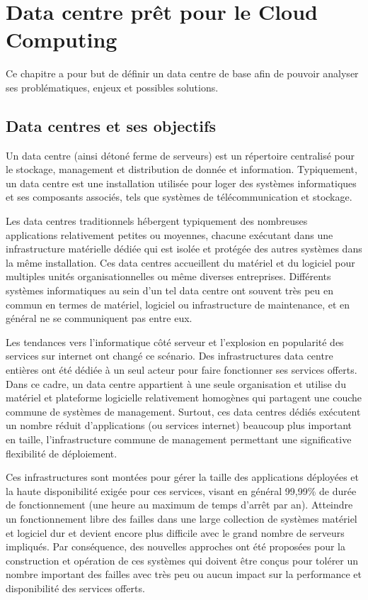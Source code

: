 \chapter{Data centre prêt pour le Cloud Computing}
\label{chap-1}

Ce chapitre a pour but de définir un data centre de base afin de pouvoir analyser ses problématiques, enjeux et possibles solutions.

\section{Data centres et ses objectifs}

Un data centre (ainsi détoné ferme de serveurs) est un répertoire centralisé pour le stockage, management et distribution de donnée et information. Typiquement, un data centre est une installation utilisée pour loger des systèmes informatiques et ses composants associés, tels que systèmes de télécommunication et stockage. \cite{understandingCloudWhatDC}

Les data centres traditionnels hébergent typiquement des nombreuses applications relativement petites ou moyennes, chacune exécutant dans une infrastructure matérielle dédiée qui est isolée et protégée des autres systèmes dans la même installation. Ces data centres accueillent du matériel et du logiciel pour multiples unités organisationnelles ou même diverses entreprises. Différents systèmes informatiques au sein d'un tel data centre ont souvent très peu en commun en termes de matériel, logiciel ou infrastructure de maintenance, et en général ne se communiquent pas entre eux. 


Les tendances vers l'informatique côté serveur et l'explosion en popularité des services sur internet ont changé ce scénario. Des infrastructures data centre entières ont été dédiée à un seul acteur pour faire fonctionner ses services offerts. Dans ce cadre, un data centre appartient à une seule organisation et utilise du matériel et plateforme logicielle relativement homogènes qui partagent une couche commune de systèmes de management. Surtout, ces data centres dédiés exécutent un nombre réduit d'applications (ou services internet) beaucoup plus important en taille, l'infrastructure commune de management permettant une significative flexibilité de déploiement. 

Ces infrastructures sont montées pour gérer la taille des applications déployées et la haute disponibilité exigée pour ces services, visant en général 99,99\% de durée de fonctionnement (une heure au maximum de temps d'arrêt par an). Atteindre un fonctionnement libre des failles dans une large collection de systèmes matériel et logiciel dur et devient encore plus difficile avec le grand nombre de serveurs impliqués. Par conséquence, des nouvelles approches ont été proposées pour la construction et opération de ces systèmes qui doivent être conçus pour tolérer un nombre important des failles avec très peu ou aucun impact sur la performance et disponibilité des services offerts. \cite{datacenterAsComputerIntro}

